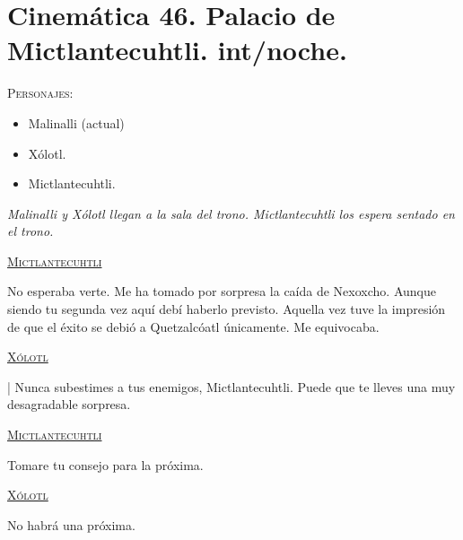 \section{Cinemática 46. Palacio de Mictlantecuhtli. int/noche.} \label{Cin:Cinematica46}
 \textsc{Personajes}:
 \begin{itemize}
 \item Malinalli (actual)
 \item Xólotl.
 \item Mictlantecuhtli.
 \end{itemize}
\textit{Malinalli y Xólotl llegan a la sala del trono. Mictlantecuhtli los espera sentado en el trono. }
\begin{center}
\textsc{\underline{Mictlantecuhtli}}
\\
\par
No esperaba verte. Me ha tomado por sorpresa la caída de Nexoxcho. Aunque siendo tu segunda vez aquí debí haberlo previsto. Aquella vez tuve la impresión de que el éxito se debió a Quetzalcóatl únicamente. Me equivocaba.
\\
\par
\textsc{\underline{Xólotl}}
\\
\par|
Nunca subestimes a tus enemigos,  Mictlantecuhtli. Puede que te lleves una muy desagradable sorpresa.
\\
\par
\textsc{\underline{Mictlantecuhtli}}
\\
\par
Tomare tu consejo para la próxima.
\\
\par
\textsc{\underline{Xólotl}}
\\
\par
No habrá una próxima.  
\end{center}
